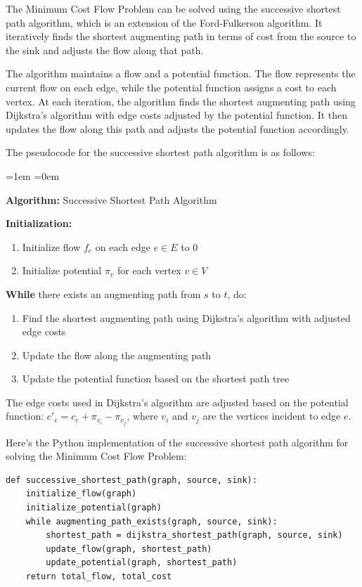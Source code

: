 \documentclass[12pt]{book} %
\begin{document}
The Minimum Cost Flow Problem can be solved using the successive shortest path algorithm, which is an extension of the Ford-Fulkerson algorithm. It iteratively finds the shortest augmenting path in terms of cost from the source to the sink and adjusts the flow along that path.

The algorithm maintains a flow and a potential function. The flow represents the current flow on each edge, while the potential function assigns a cost to each vertex. At each iteration, the algorithm finds the shortest augmenting path using Dijkstra's algorithm with edge costs adjusted by the potential function. It then updates the flow along this path and adjusts the potential function accordingly.

The pseudocode for the successive shortest path algorithm is as follows:
\FloatBarrier
\begin{list}{}{\leftmargin=1em \itemindent=0em}
\item \textbf{Algorithm:} Successive Shortest Path Algorithm
\item \textbf{Initialization:} 
\begin{enumerate}
\item Initialize flow $f_e$ on each edge $e \in E$ to 0
\item Initialize potential $\pi_v$ for each vertex $v \in V$
\end{enumerate}
\item \textbf{While} there exists an augmenting path from $s$ to $t$, do:
\begin{enumerate}
\item Find the shortest augmenting path using Dijkstra's algorithm with adjusted edge costs
\item Update the flow along the augmenting path
\item Update the potential function based on the shortest path tree
\end{enumerate}
\end{list}
\FloatBarrier
The edge costs used in Dijkstra's algorithm are adjusted based on the potential function: \(c'_e = c_e + \pi_{v_i} - \pi_{v_j}\), where \(v_i\) and \(v_j\) are the vertices incident to edge \(e\).

Here's the Python implementation of the successive shortest path algorithm for solving the Minimum Cost Flow Problem:
\FloatBarrier
\begin{lstlisting}
def successive_shortest_path(graph, source, sink):
    initialize_flow(graph)
    initialize_potential(graph)
    while augmenting_path_exists(graph, source, sink):
        shortest_path = dijkstra_shortest_path(graph, source, sink)
        update_flow(graph, shortest_path)
        update_potential(graph, shortest_path)
    return total_flow, total_cost
\end{lstlisting}
\FloatBarrier
\end{document}

